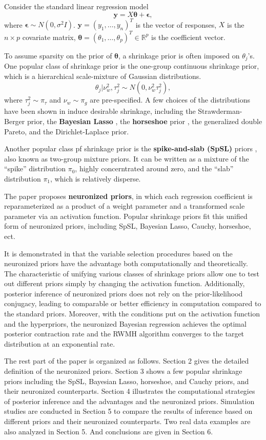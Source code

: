 Consider the standard linear regression model
$$ \bm{y} = X \bm{\theta} + \bm{\epsilon}, $$
where $\bm{\epsilon} \sim N(0,\sigma^2 I)$. $\bm{y} = (y_1, \dots, y_n)^T $ is the vector of responses, $X$ is the $n \times p$ covariate matrix, $ \bm{\theta} = (\theta_1, \dots, \theta_p)^T \in \mathbb{R}^p$ is the coefficient vector.

To assume sparsity on the prior of $\bm{\theta}$, a shrinkage prior is often imposed on $\theta_j$'s. One popular class of shrinkage prior is the one-group continuous shrinkage prior, which is a hierarchical scale-mixture of Gaussian distributions. 
$$ \theta_j | \nu_w^2, \tau_j^2 \sim N(0,\nu_w^2\tau_j^2),$$
where $\tau_j^2 \sim \pi_\tau$ and $\nu_w  \sim \pi_g$ are pre-specified.
A few choices of the distributions have been shown in induce desirable shrinkage, including the Strawderman-Berger prior, the \textbf{Bayesian Lasso} \citep{park2008bayesian}, the \textbf{horseshoe} prior \citep{carvalho2010horseshoe}, the generalized double Pareto, and the Dirichlet-Laplace prior.

Another popular class pf shrinkage prior is the \textbf{spike-and-slab (SpSL)} priors \citep{mitchell1988bayesian,george1993variable}, also known as two-group mixture priors. It can be written as a mixture of the ``spike'' distribution $\pi_0$, highly concerntrated around zero, and the ``slab'' distribution $\pi_1$, which is relatively disperse.

The paper \citep{shin2021neuronized} proposes \textbf{neuronized priors}, in which each regression coefficient is reparameterized as a product of a weight parameter and a transformed scale parameter via an activation function. Popular shrinkage priors fit this unified form of neuronized priors, including SpSL, Bayesian Lasso, Cauchy, horseshoe, ect.

It is demonstrated in \cite{shin2021neuronized} that the variable selection procedures based on the neuronized priors have the advantage both computationally and theoretically. The characteristic of unifying various classes of shrinkage priors allow one to test out different priors simply by changing the activation function. Additionally, posterior inference of neuronized priors does not rely on the prior-likelihood conjugacy, leading to comparable or better efficiency in computation compared to the standard priors. Moreover, with the conditions put on the activation function and the hyperpriors, the neuronized Bayesian regression achieves the optimal posterior contraction rate and the RWMH algorithm converges to the target distribution at an exponential rate.

The rest part of the paper is organized as follows. Section 2 gives the detailed definition of the neuronized priors. Section 3 shows a few popular shrinkage priors including the SpSL, Bayesian Lasso, horseshoe, and Cauchy priors, and their neuronized counterparts. Section 4 illustrates the computational strategies of posterior inference and the advantages and the neuronized priors. Simulation studies are conducted in Section 5 to compare the results of inference based on different priors and their neuronized counterparts. Two real data examples are also analyzed in Section 5. And conclusions are given in Section 6.


